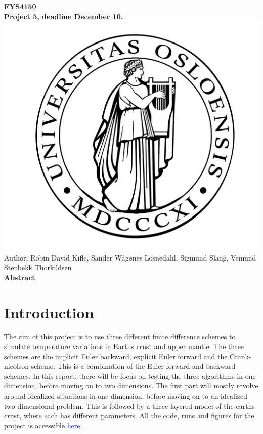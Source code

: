 \documentclass[10pt,a4paper]{article}
\begin{document}
\begin{center}

{\LARGE\bf
FYS4150\\
\vspace{0.5cm}
Project 5, deadline December 10.
}
 \includegraphics[scale=0.075]{figures/uio.png}\\
Author: Robin David Kifle, Sander Wågønes Losnedahl, Sigmund Slang, Vemund Stenbekk Thorkildsen\\
\vspace{1cm}
{\LARGE\bf
Abstract
}\\
\end{center}

\newpage
\section*{Introduction}
The aim of this project is to use three different finite difference schemes to simulate temperature variations in Earths crust and upper mantle. The three schemes are the implicit Euler backward, explicit Euler forward and the Crank-nicolson scheme. This is a combination of the Euler forward and backward schemes. In this report, there will be focus on testing the three algorithms in one dimension, before moving on to two dimensions. The first part will mostly revolve around idealized situations in one dimension, before moving on to an idealized two dimensional problem. This is followed by a three layered model of the earths crust, where each has different parameters. All the code, runs and figures for the project is accessible \href{https://github.com/VemundStenbekkThorkildsen/Assignment5}{\textcolor{blue}{here}}.  
\end{document}
